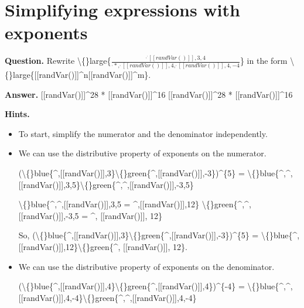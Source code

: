 \documentclass{article}
\begin{document}
\section*{Simplifying expressions with exponents}
\textbf{Question.} Rewrite \textbackslash\{\}large\{$\frac{^,^,[[randVar()]],3,4}{^,*,^,[[randVar()]],4,^,[[randVar()]],4,-4}$\} in the form
                    \textbackslash\{\}large\{[[randVar()]]\textasciicircum{}n[[randVar()]]\textasciicircum{}m\}.

\textbf{Answer.} [[randVar()]]\textasciicircum{}28 * [[randVar()]]\textasciicircum{}16
                    [[randVar()]]\textasciicircum{}28 * [[randVar()]]\textasciicircum{}16

\textbf{Hints.}
\begin{itemize}
  \item To start, simplify the numerator and the denominator independently.
  \item We can use the distributive property of exponents on the numerator.
                            
                                (\textbackslash\{\}blue\{\textasciicircum{},[[randVar()]],3\}\textbackslash\{\}green\{\textasciicircum{},[[randVar()]],-3\})\textasciicircum{}\{5\} = 
                                \textbackslash\{\}blue\{\textasciicircum{},\textasciicircum{},[[randVar()]],3,5\}\textbackslash\{\}green\{\textasciicircum{},\textasciicircum{},[[randVar()]],-3,5\}
                            
                        
                        
                            
                                \textbackslash\{\}blue\{\textasciicircum{},\textasciicircum{},[[randVar()]],3,5 = \textasciicircum{},[[randVar()]],12\}
                                \textbackslash\{\}green\{\textasciicircum{},\textasciicircum{},[[randVar()]],-3,5 = \textasciicircum{}, [[randVar()]], 12\}
                            
                            So, 
                                (\textbackslash\{\}blue\{\textasciicircum{},[[randVar()]],3\}\textbackslash\{\}green\{\textasciicircum{},[[randVar()]],-3\})\textasciicircum{}\{5\} = 
                                \textbackslash\{\}blue\{\textasciicircum{},[[randVar()]],12\}\textbackslash\{\}green\{\textasciicircum{}, [[randVar()]], 12\}.
  \item We can use the distributive property of exponents on the denominator.
                        
                            (\textbackslash\{\}blue\{\textasciicircum{},[[randVar()]],4\}\textbackslash\{\}green\{\textasciicircum{},[[randVar()]],4\})\textasciicircum{}\{-4\} = 
                            \textbackslash\{\}blue\{\textasciicircum{},\textasciicircum{},[[randVar()]],4,-4\}\textbackslash\{\}green\{\textasciicircum{},\textasciicircum{},[[randVar()]],4,-4\}
                        

\end{itemize}
\end{document}
